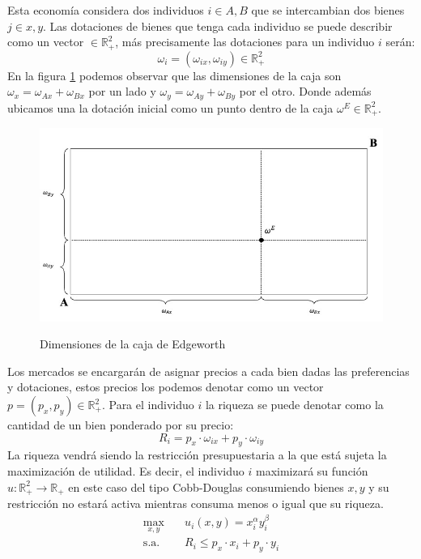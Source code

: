 Esta economía considera dos individuos $i \in A,B$ que se intercambian dos bienes $j \in x,y$. Las dotaciones de bienes que tenga cada individuo se puede describir como un vector $\in \mathbb{R}^2_+$, más precisamente las dotaciones para un individuo $i$ serán:
\begin{equation*}
    \omega_i = (\omega_{ix} , \omega_{iy}) \in \mathbb{R}^2_+
\end{equation*}
En la figura \ref{fig:caja dimensiones} podemos observar que las dimensiones de la caja son $\omega_x = \omega_{Ax} + \omega_{Bx}$ por un lado y $\omega_y = \omega_{Ay} + \omega_{By}$ por el otro. Donde además ubicamos una la dotación inicial como un punto dentro de la caja $\omega^E \in \mathbb{R}^2_+$.
\begin{figure}
    \centering
    \caption{Dimensiones de la caja de Edgeworth}
    \includegraphics[width=\textwidth]{Figuras/EG Dotacion inicial.jpeg}
    \label{fig:caja dimensiones}
\end{figure}
Los mercados se encargarán de asignar precios a cada bien dadas las preferencias y dotaciones, estos precios los podemos denotar como un vector $p = (p_x, p_y) \in \mathbb{R}^2_+$. Para el individuo $i$ la riqueza se puede denotar como la cantidad de un bien ponderado por su precio: 
\begin{equation*}
    R_i = p_x \cdot \omega_{ix} + p_y \cdot \omega_{iy}
\end{equation*}
La riqueza vendrá siendo la restricción presupuestaria a la que está sujeta la maximización de utilidad. Es decir, el individuo $i$ maximizará su función $u: \mathbb{R}^2_+ \xrightarrow{} \mathbb{R}_+$ en este caso del tipo Cobb-Douglas consumiendo bienes $x,y$ y su restricción no estará activa mientras consuma menos o igual que su riqueza.
\begin{align*}
    \max_{x,y} &\quad u_i(x,y) = x_i^\alpha y_i^{\beta} \\
    \text{s.a.} &\quad R_i \leq p_x \cdot x_i + p_y \cdot y_i
\end{align*}
